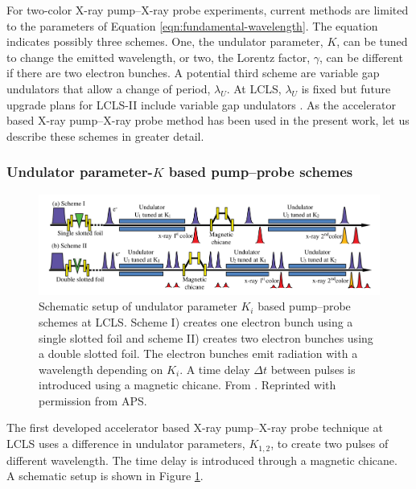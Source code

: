 %
For two-color X-ray pump--X-ray probe experiments, current methods are limited to the parameters of Equation \eqref{eqn:fundamental-wavelength}. The equation indicates possibly three schemes. One, the undulator parameter, $K$, can be tuned to change the emitted wavelength, or two, the Lorentz factor, $\gamma$, can be different if there are two electron bunches. A potential third scheme are variable gap undulators that allow a change of period, $\lambda_{U}$. At LCLS, $\lambda_{U}$ is fixed but future upgrade plans for LCLS-II include variable gap undulators \citep{Galayda-2014-IPAC}. As the accelerator based X-ray pump--X-ray probe method has been used in the present work, let us describe these schemes in greater detail.
%
%
%
\subsubsection{Undulator parameter-$K$ based pump--probe schemes}
\begin{figure}
	\centering
		\includegraphics[width=1.00\textwidth]{images/Albertos-pump-probe-scheme.png}
	\caption[Schematic setup of an undulator based pump--probe scheme.]{Schematic setup of undulator parameter $K_{i}$ based pump--probe schemes at LCLS. Scheme I) creates one electron bunch using a single slotted foil and scheme II) creates two electron bunches using a double slotted foil. The electron bunches emit radiation with a wavelength depending on $K_{i}$. A time delay $\Delta t$ between pulses is introduced using a magnetic chicane. From \cite{Lutman-2013-PRL}. Reprinted with permission from APS.}
	\label{fig:Albertos-pump-probe-scheme}
\end{figure}
The first developed accelerator based X-ray pump--X-ray probe technique at LCLS \cite{Lutman-2013-PRL} uses a difference in undulator parameters, $K_{1,2}$, to create two pulses of different wavelength. The time delay is introduced through a magnetic chicane.\\[1\baselineskip]
%
A schematic setup is shown in Figure \ref{fig:Albertos-pump-probe-scheme}.
